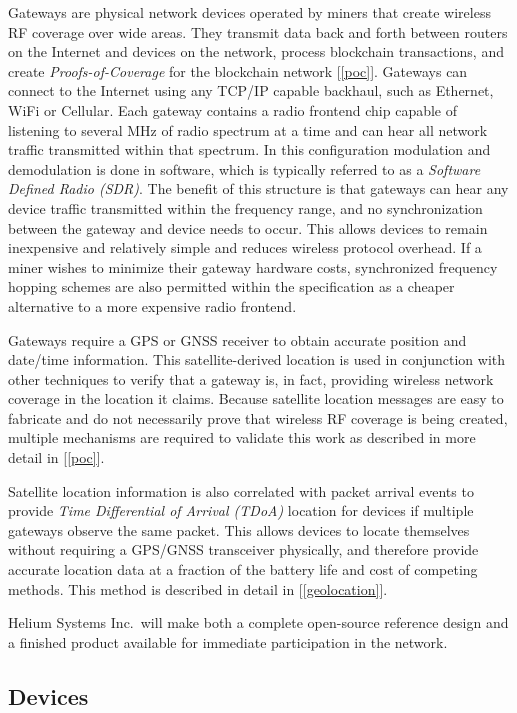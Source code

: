 \documentclass[UTF8, 10pt, nonatbib, nocopyrightspace, reprint]{sigplanconf}
\newcommand{\secref}[1]{[\autoref{#1}]}
\begin{document}
Gateways are physical network devices operated by miners that create wireless RF coverage over wide areas. They transmit data back and forth between routers on the Internet and devices on the network, process blockchain transactions, and create \emph{Proofs-of-Coverage} for the blockchain network \secref{poc}. Gateways can connect to the Internet using any TCP/IP capable backhaul, such as Ethernet, WiFi or Cellular. Each gateway contains a radio frontend chip capable of listening to several MHz of radio spectrum at a time and can hear all network traffic transmitted within that spectrum. In this configuration modulation and demodulation is done in software, which is typically referred to as a \emph{Software Defined Radio (SDR)}. The benefit of this structure is that gateways can hear any device traffic transmitted within the frequency range, and no synchronization between the gateway and device needs to occur. This allows devices to remain inexpensive and relatively simple and reduces wireless protocol overhead. If a miner wishes to minimize their gateway hardware costs, synchronized frequency hopping schemes are also permitted within the specification as a cheaper alternative to a more expensive radio frontend.

Gateways require a GPS or GNSS receiver to obtain accurate position and date/time information. This satellite-derived location is used in conjunction with other techniques to verify that a gateway is, in fact, providing wireless network coverage in the location it claims. Because satellite location messages are easy to fabricate and do not necessarily prove that wireless RF coverage is being created, multiple mechanisms are required to validate this work as described in more detail in \secref{poc}.

Satellite location information is also correlated with packet arrival events to provide \emph{Time Differential of Arrival (TDoA)} location for devices if multiple gateways observe the same packet. This allows devices to locate themselves without requiring a GPS/GNSS transceiver physically, and therefore provide accurate location data at a fraction of the battery life and cost of competing methods. This method is described in detail in \secref{geolocation}.

Helium Systems Inc.\ will make both a complete open-source reference design and a finished product available for immediate participation in the network.

\subsection{Devices}\label{devices}
\end{document}

